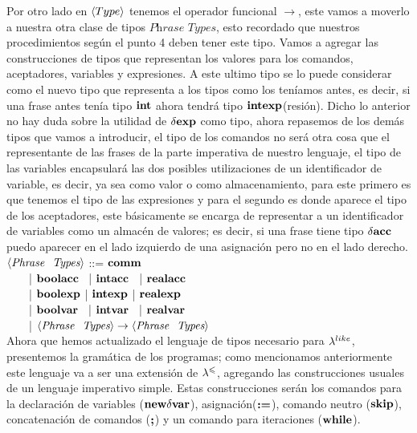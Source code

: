 Por otro lado en $\langle Type \rangle$ tenemos el operador funcional $\rightarrow$, este vamos 
a moverlo a nuestra otra clase de tipos $\textit{Phrase Types}$, esto recordado
que nuestros procedimientos seg\'un el punto 4 deben tener este tipo. Vamos a agregar las
construcciones de tipos que representan los valores para los comandos, aceptadores, variables y 
expresiones. A este ultimo tipo se lo puede considerar como el nuevo tipo que 
representa a los tipos como los ten\'iamos antes, es decir, si una frase antes
ten\'ia tipo $\textbf{int}$ ahora tendr\'a tipo $\textbf{int}\textbf{exp}$(resi\'on). Dicho lo
anterior no hay duda sobre la utilidad de $\delta \textbf{exp}$ como tipo, ahora repasemos
de los dem\'as tipos que vamos a introducir, el tipo de los comandos no ser\'a
otra cosa que el representante de las frases de la parte imperativa de
nuestro lenguaje, el tipo de las variables encapsular\'a las dos posibles utilizaciones
de un identificador de variable, es decir, ya sea como valor o como almacenamiento,
para este primero es que tenemos el tipo de las expresiones y para el segundo es
donde aparece el tipo de los aceptadores, este b\'asicamente se encarga de 
representar a un identificador de variables como un almac\'en de valores; es
decir, si una frase tiene tipo $\delta \textbf{acc}$ puedo aparecer en el lado izquierdo
de una asignaci\'on pero no en el lado derecho.\\

\noindent
$\langle \textit{Phrase \ Types} \rangle$ ::= $\textbf{comm}$\\
\indent \indent \indent \indent \ \ \ \
| $\textbf{boolacc}$ \ | $\textbf{intacc}$ \ | $\textbf{realacc}$\\
\indent \indent \indent \indent \ \ \ \
| $\textbf{boolexp}$ | $\textbf{intexp}$ | $\textbf{realexp}$\\
\indent \indent \indent \indent \ \ \ \
| $\textbf{boolvar}$ \ | $\textbf{intvar}$ \ | $\textbf{realvar}$\\
\indent \indent \indent \indent \ \ \ \
| $\langle \textit{Phrase \ Types} \rangle \rightarrow \langle \textit{Phrase \ Types} \rangle$\\

Ahora que hemos actualizado el lenguaje de tipos necesario para $\lambda^{like}$, presentemos
la gram\'atica de los programas; como mencionamos anteriormente este lenguaje va a 
ser una extensi\'on de $\lambda^{\leqslant}$, agregando las construcciones usuales de un lenguaje 
imperativo simple. Estas construcciones 
ser\'an los comandos para la declaraci\'on de variables ($\textbf{new} \delta \textbf{var}$), 
asignaci\'on($\textbf{:=}$), comando neutro ($\textbf{skip}$), concatenaci\'on de comandos ($\textbf{;}$)
y un comando para iteraciones ($\textbf{while}$).\\

